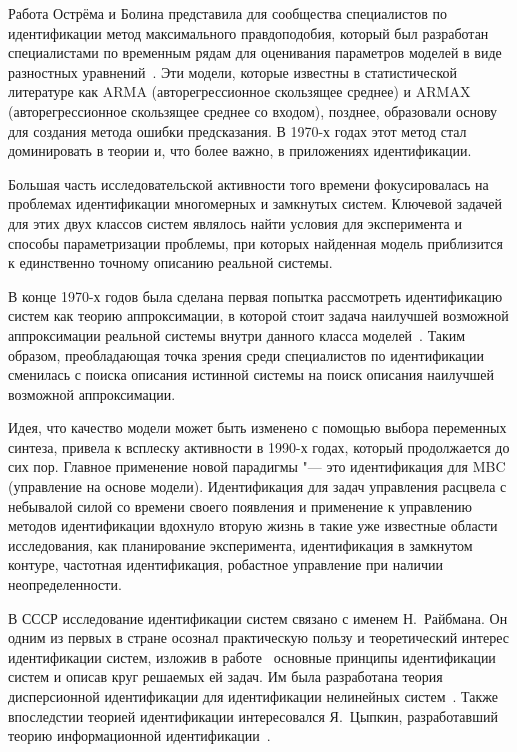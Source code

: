 Работа Острёма и Болина представила для сообщества специалистов по идентификации метод
максимального правдоподобия, который был разработан специалистами по временным рядам для
оценивания параметров моделей в виде разностных уравнений~\cite{koopmans_1950}.
Эти модели, которые известны в статистической литературе как ARMA
(авторегрессионное скользящее среднее) и
ARMAX (авторегрессионное скользящее среднее со входом), позднее,
образовали основу для создания метода ошибки предсказания.
В 1970-х годах этот метод стал доминировать в теории и, что более важно, в приложениях идентификации.

Большая часть исследовательской активности того времени фокусировалась на проблемах идентификации
многомерных и замкнутых систем.
Ключевой задачей для этих двух классов систем являлось найти условия для эксперимента и
способы параметризации проблемы, при которых найденная модель приблизится к единственно точному
описанию реальной системы.

В конце 1970-х годов была сделана первая попытка рассмотреть идентификацию систем как
теорию аппроксимации, в которой стоит задача наилучшей возможной аппроксимации реальной системы
внутри данного класса моделей~\cite{ljung_1976, anderson_1978, ljung_1979}.
Таким образом, преобладающая точка зрения среди специалистов по идентификации сменилась с
поиска описания истинной системы на поиск описания наилучшей возможной аппроксимации.

Идея, что качество модели может быть изменено с помощью выбора переменных синтеза,
привела к всплеску активности в 1990-х годах, который продолжается до сих пор.
Главное применение новой парадигмы "--- это идентификация для MBC (управление на основе модели).
Идентификация для задач управления расцвела с небывалой силой со времени своего появления и
применение к управлению методов идентификации вдохнуло вторую жизнь в такие уже
известные области исследования, как планирование эксперимента, идентификация в замкнутом контуре,
частотная идентификация, робастное управление при наличии неопределенности.

В СССР исследование идентификации систем связано с именем Н.~Райбмана.
Он одним из первых в стране осознал практическую пользу и теоретический интерес идентификации систем,
изложив в работе~\cite{raibman_1970} основные принципы идентификации систем и описав круг
решаемых ей задач.
Им была разработана теория дисперсионной идентификации для идентификации
нелинейных систем~\cite{raibman_1981}.
Также впоследстии теорией идентификации интересовался Я.~Цыпкин,
разработавший теорию информационной идентификации~\cite{tsypkin_1995}.

